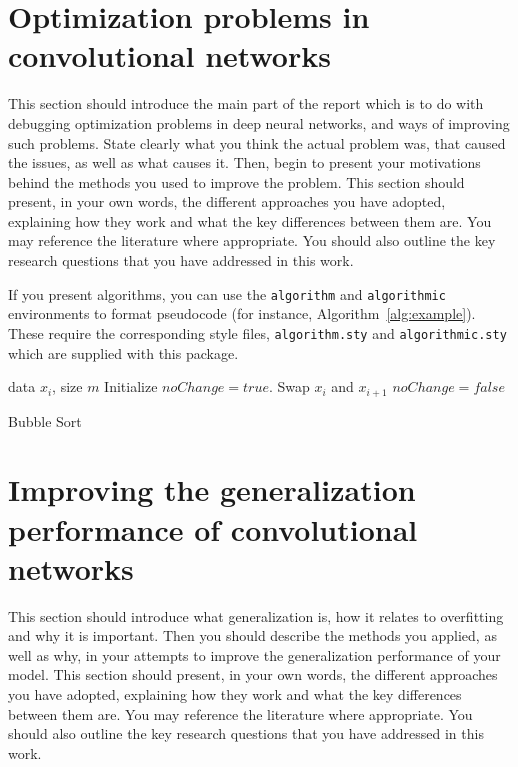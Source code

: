 \documentclass{article}
\begin{document}
\section{Optimization problems in convolutional networks}
This section should introduce the main part of the report which is to do with debugging optimization problems in deep neural networks, and ways of improving such problems. State clearly what you think the actual problem was, that caused the issues, as well as what causes it. Then, begin to present your motivations behind the methods you used to improve the problem. This section should present, in your own words, the different approaches you have adopted, explaining how they work and what the key differences between them are.  You may reference the literature where appropriate.   You should also outline the key research questions that you have addressed in this work.

If you present algorithms, you can use the \verb+algorithm+ and \verb+algorithmic+ environments to format pseudocode (for instance, Algorithm~\ref{alg:example}). These require the corresponding style files, \verb+algorithm.sty+ and \verb+algorithmic.sty+ which are supplied with this package. 

\begin{algorithm}[ht]
\begin{algorithmic}
    data $x_i$, size $m$
   \REPEAT
   \STATE Initialize $noChange = true$.
   \STATE Swap $x_i$ and $x_{i+1}$
   \STATE $noChange = false$
   \ENDIF
   \ENDFOR
\end{algorithmic}
  \caption{Bubble Sort}
  \label{alg:example}
\end{algorithm}

\section{Improving the generalization performance of convolutional networks}
This section should introduce what generalization is, how it relates to overfitting and why it is important. Then you should describe the methods you applied, as well as why, in your attempts to improve the generalization performance of your model. This section should present, in your own words, the different approaches you have adopted, explaining how they work and what the key differences between them are.  You may reference the literature where appropriate.   You should also outline the key research questions that you have addressed in this work.
\end{document}
